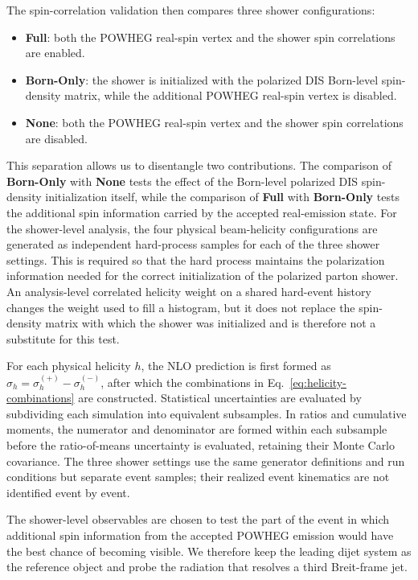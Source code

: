 \documentclass[a4paper,11pt]{article}
\begin{document}
The spin-correlation validation then compares three shower configurations:
\begin{itemize}
\item \textbf{Full}: both the POWHEG real-spin vertex and the shower spin
  correlations are enabled.
\item \textbf{Born-Only}: the shower is initialized with the polarized DIS
  Born-level spin-density matrix, while the additional POWHEG real-spin vertex
  is disabled.
\item \textbf{None}: both the POWHEG real-spin vertex and the shower spin
  correlations are disabled.
\end{itemize}
This separation allows us to disentangle two contributions. The comparison of
\textbf{Born-Only} with \textbf{None} tests the effect of the Born-level
polarized DIS spin-density initialization itself, while the comparison of
\textbf{Full} with \textbf{Born-Only} tests the additional spin information
carried by the accepted real-emission state.
For the shower-level analysis, the four physical beam-helicity configurations
are generated as independent hard-process samples for each of the three shower
settings. This is required so that the hard process maintains the polarization
information needed for the correct initialization of the polarized parton
shower. An analysis-level correlated helicity weight on a shared hard-event
history changes the weight used to fill a histogram, but it does not replace
the spin-density matrix with which the shower was initialized and is therefore
not a substitute for this test.

For each physical helicity $h$, the NLO prediction is first formed as
$\sigma_h=\sigma_h^{(+)}-\sigma_h^{(-)}$, after which the combinations in
Eq.~\eqref{eq:helicity-combinations} are constructed. Statistical uncertainties
are evaluated by subdividing each simulation into equivalent subsamples. In
ratios and cumulative moments, the numerator and denominator are formed within
each subsample before the ratio-of-means uncertainty is evaluated, retaining
their Monte Carlo covariance. The three shower settings use the same generator
definitions and run conditions but separate event samples; their realized
event kinematics are not identified event by event.

The shower-level observables are chosen to test the part of the event in which
additional spin information from the accepted POWHEG emission would have the
best chance of becoming visible. We therefore keep the leading dijet system as
the reference object and probe the radiation that resolves a third Breit-frame
jet.
\end{document}

